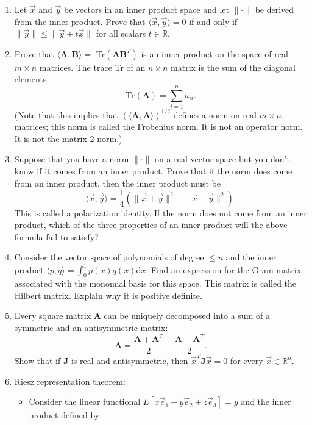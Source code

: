 \documentclass[11pt,fleqn]{article}
\begin{document}
\begin{enumerate}
\item Let $\vec{x}$ and $\vec{y}$ be vectors in an inner product space and let $\|\cdot\|$ be derived from the inner product. Prove that $\langle\vec{x},\vec{y}\rangle=0$ if and only if $\|\vec{y}\|\le\|\vec{y}+t\vec{x}\|$ for all scalars $t\in\mathbb{R}$.
\item Prove that $\langle\mathbf{A},\mathbf{B}\rangle=$ Tr$\left(\mathbf{AB}^T\right)$ is an inner product on the space of real $m\times n$ matrices. The trace Tr of an $n\times n$ matrix is the sum of the diagonal elements
\[\text{Tr}(\mathbf{A}) = \sum_{i=1}^na_{ii}.\]
(Note that this implies that $(\langle\mathbf{A},\mathbf{A}\rangle)^{1/2}$ defines a norm on real $m\times n$ matrices; this norm is called the Frobenius norm. It is not an operator norm. It is not the matrix 2-norm.)
\item Suppose that you have a norm $\|\cdot\|$ on a real vector space but you don't know if it comes from an inner product.
Prove that if the norm does come from an inner product, then the inner product must be
	\[\langle\vec{x},\vec{y}\rangle = \frac{1}{4}\left(\|\vec{x}+\vec{y}\|^2-\|\vec{x}-\vec{y}\|^2\right).\] This is called a polarization identity. If the norm does not come from an inner product, which of the three properties of an inner product will the above formula fail to satisfy?
\item Consider the vector space of polynomials of degree $\le n$ and the inner product $\langle p,q\rangle = \int_0^1 p(x)q(x)\mathrm{d}x$. Find an expression for the Gram matrix associated with the monomial basis for this space. This matrix is called the Hilbert matrix. Explain why it is positive definite.
\item Every square matrix $\mathbf{A}$ can be uniquely decomposed into a sum of a symmetric and an antisymmetric matrix:
\[\mathbf{A} = \frac{\mathbf{A}+\mathbf{A}^T}{2} + \frac{\mathbf{A} - \mathbf{A}^T}{2}.\]
Show that if $\mathbf{J}$ is real and antisymmetric, then $\vec{x}^T\mathbf{J}\vec{x} = 0$ for every $\vec{x}\in\mathbb{R}^n$.
\item Riesz representation theorem:
	\begin{itemize}
	\item[(a)] Consider the linear functional $L[x\vec{e}_1+y\vec{e}_2+z\vec{e}_3] = y$ and the inner product defined by

\end{itemize}
\end{enumerate}
\end{document}
